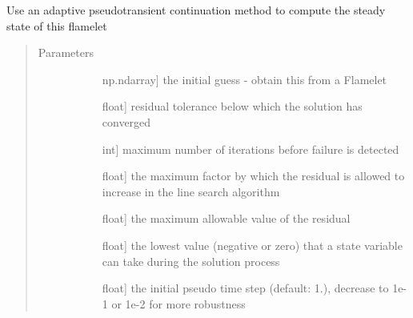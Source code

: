 \documentclass[letterpaper,10pt,english]{sphinxmanual}
\begin{document}
\begin{fulllineitems}
\begin{fulllineitems}
\label{\detokenize{spitfire.chemistry.flamelet:spitfire.chemistry.flamelet.Flamelet.steady_solve_psitc}}
Use an adaptive pseudotransient continuation method to compute the steady state of this flamelet
\begin{quote}\begin{description}
\item[{Parameters}] \leavevmode\begin{description}
\item[{}] \leavevmode{[}np.ndarray{]}
the initial guess - obtain this from a Flamelet

\item[{}] \leavevmode{[}float{]}
residual tolerance below which the solution has converged

\item[{}] \leavevmode{[}int{]}
maximum number of iterations before failure is detected

\item[{}] \leavevmode{[}float{]}
the maximum factor by which the residual is allowed to increase in the line search algorithm

\item[{}] \leavevmode{[}float{]}
the maximum allowable value of the residual

\item[{}] \leavevmode{[}float{]}
the lowest value (negative or zero) that a state variable can take during the solution process

\item[{}] \leavevmode{[}float{]}
the initial pseudo time step (default: 1.), decrease to 1e-1 or 1e-2 for more robustness


\end{description}
\end{description}
\end{quote}
\end{fulllineitems}
\end{fulllineitems}
\end{document}
